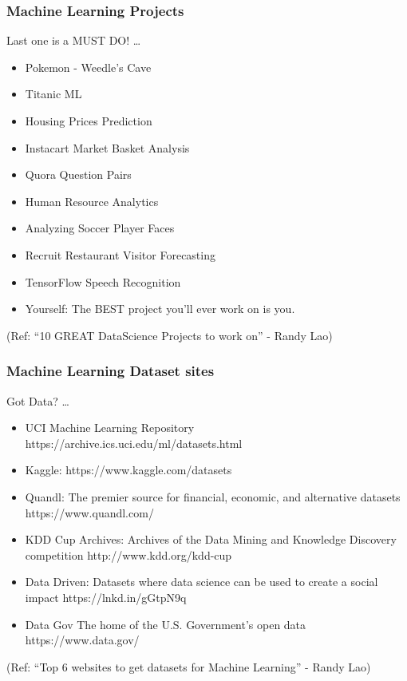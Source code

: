 \begin{frame}\frametitle{Machine Learning Projects}
Last one is a MUST DO! \ldots

\footnotesize
\begin{itemize}
\item Pokemon - Weedle's Cave 
\item  Titanic ML
\item  Housing Prices Prediction 
\item  Instacart Market Basket Analysis 
\item  Quora Question Pairs 
\item  Human Resource Analytics 
\item  Analyzing Soccer Player Faces
\item  Recruit Restaurant Visitor Forecasting 
\item  TensorFlow Speech Recognition 
\item  Yourself: The BEST project you'll ever work on is you.
\end{itemize}

(Ref: ``10 GREAT DataScience Projects to work on'' - Randy Lao)
\end{frame}

\begin{frame}\frametitle{Machine Learning Dataset sites}
Got Data? \ldots

\footnotesize
\begin{itemize}
\item UCI Machine Learning Repository
https://archive.ics.uci.edu/ml/datasets.html

\item Kaggle: 
https://www.kaggle.com/datasets

\item Quandl: The premier source for financial, economic, and alternative datasets
https://www.quandl.com/

\item KDD Cup Archives: Archives of the Data Mining and Knowledge Discovery competition
http://www.kdd.org/kdd-cup

\item Data Driven: Datasets where data science can be used to create a social impact
https://lnkd.in/gGtpN9q

\item Data Gov 
The home of the U.S. Government’s open data
https://www.data.gov/
\end{itemize}

(Ref: ``Top 6 websites to get datasets for Machine Learning'' - Randy Lao)
\end{frame}

